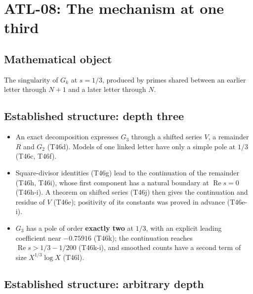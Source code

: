 \documentclass[
  11pt,
]{article}
\providecommand{\tightlist}{%
  \setlength{\itemsep}{0pt}\setlength{\parskip}{0pt}}
\begin{document}
\hypertarget{atl-08-the-mechanism-at-one-third}{%
\section{ATL-08: The mechanism at one
third}\label{atl-08-the-mechanism-at-one-third}}

\hypertarget{mathematical-object-7}{%
\subsection{Mathematical object}\label{mathematical-object-7}}

The singularity of \(G_k\) at \(s=1/3\), produced by primes shared
between an earlier letter through \(N+1\) and a later letter through
\(N\).

\hypertarget{established-structure-depth-three}{%
\subsection{Established structure: depth
three}\label{established-structure-depth-three}}

\begin{itemize}
\tightlist
\item
  An exact decomposition expresses \(G_3\) through a shifted series
  \(V\), a remainder \(R\) and \(G_2\) (T46d). Models of one linked
  letter have only a simple pole at \(1/3\) (T46c, T46f).
\item
  Square-divisor identities (T46g) lead to the continuation of the
  remainder (T46h, T46i), whose first component has a natural boundary
  at \(\operatorname{Re}s=0\) (T46h-i). A theorem on shifted series
  (T46j) then gives the continuation and residue of \(V\) (T46e);
  positivity of its constants was proved in advance (T46e-i).
\item
  \(G_3\) has a pole of order \textbf{exactly two} at \(1/3\), with an
  explicit leading coefficient near \(-0.75916\) (T46k); the
  continuation reaches \(\operatorname{Re}s>1/3-1/200\) (T46k-i), and
  smoothed counts have a second term of size \(X^{1/3}\log X\) (T46l).
\end{itemize}

\hypertarget{established-structure-arbitrary-depth}{%
\subsection{Established structure: arbitrary
depth}\label{established-structure-arbitrary-depth}}
\end{document}
